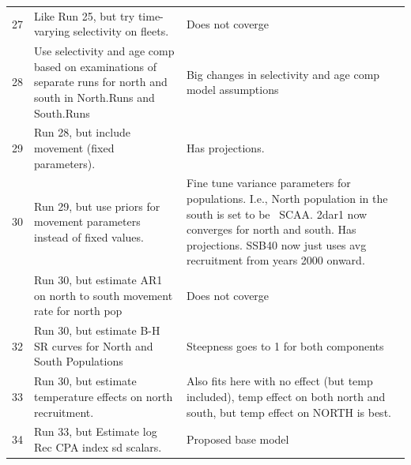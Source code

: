 \documentclass[
]{article}
\begin{document}
\begin{landscape}
\begin{longtable}[t]{l>{\raggedright\arraybackslash}p{10cm}>{\raggedright\arraybackslash}p{12cm}}
27 & Like Run 25, but try time-varying selectivity on fleets. & Does not coverge\\
28 & Use selectivity and age comp based on examinations of separate runs for north and south in North.Runs and South.Runs & Big changes in selectivity and age comp model assumptions\\
29 & Run 28, but include movement (fixed parameters). & Has projections.\\
30 & Run 29, but use priors for movement parameters instead of fixed values. & Fine tune variance parameters for populations. I.e., North population in the south is set to be ~SCAA. 2dar1 now converges for north and south. Has projections. SSB40 now just uses avg recruitment from years 2000 onward.\\
\addlinespace
31 & Run 30, but estimate AR1 on north to south movement rate for north pop & Does not coverge\\
32 & Run 30, but estimate B-H SR curves for North and South Populations & Steepness goes to 1 for both components\\
33 & Run 30, but estimate temperature effects on north recruitment. & Also fits here with no effect (but temp included), temp effect on both north and south, but temp effect on NORTH is best.\\
34 & Run 33, but Estimate log Rec CPA index sd scalars. & Proposed base model\\*
\end{longtable}
\end{landscape}
\clearpage
\end{document}
